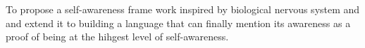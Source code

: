 \documentclass[a4paper]{article}
\title{}
\date{}
\begin{document}
    \maketitle
    
    To propose a self-awareness frame work inspired by biological nervous system and and extend it to building a language that can finally mention its awareness as a proof of being at the hihgest level of self-awareness. 
    
    
    

\end{document}
